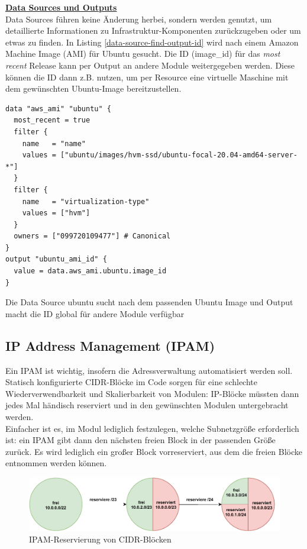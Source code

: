 \textbf{\underline{Data Sources und Outputs}}\\
Data Sources führen keine Änderung herbei, sondern werden genutzt, um detaillierte Informationen zu Infrastruktur-Komponenten zurückzugeben oder um etwas zu finden. In Listing \ref{data-source-find-output-id} wird nach einem Amazon Machine Image (AMI) für Ubuntu gesucht. Die ID (image\_id) für das \textit{most recent} Release kann per Output an andere Module weitergegeben werden. Diese können die ID dann z.B. nutzen, um per Resource eine virtuelle Maschine mit dem gewünschten Ubuntu-Image bereitzustellen.
\begin{listing}[h]
\begin{verbatim}
data "aws_ami" "ubuntu" {
  most_recent = true
  filter {
    name   = "name"
    values = ["ubuntu/images/hvm-ssd/ubuntu-focal-20.04-amd64-server-*"]
  }
  filter {
    name   = "virtualization-type"
    values = ["hvm"]
  }
  owners = ["099720109477"] # Canonical
}
output "ubuntu_ami_id" {
  value = data.aws_ami.ubuntu.image_id
}
\end{verbatim}
\caption{Die Data Source \glqq ubuntu\grqq{} sucht nach dem passenden Ubuntu Image und Output macht die ID global für andere Module verfügbar}
\label{data-source-find-output-id}
\end{listing}
\subsection{IP Address Management (IPAM)}
Ein IPAM ist wichtig, insofern die Adressverwaltung automatisiert werden soll. Statisch konfigurierte CIDR-Blöcke im Code sorgen für eine schlechte Wiederverwendbarkeit und Skalierbarkeit von Modulen: IP-Blöcke müssten dann jedes Mal händisch reserviert und in den gewünschten Modulen untergebracht werden.\\
Einfacher ist es, im Modul lediglich festzulegen, welche Subnetzgröße erforderlich ist: ein IPAM gibt dann den nächsten freien Block in der passenden Größe zurück. Es wird lediglich ein großer Block vorreserviert, aus dem die freien Blöcke entnommen werden können.

\begin{figure}[h]
  \centering
  \includegraphics[scale=0.8]{Figures/ipam_cake.pdf}
  \caption{IPAM-Reservierung von CIDR-Blöcken}
  \label{grafik: ipam_ip_reservation}
\end{figure}\FloatBarrier

